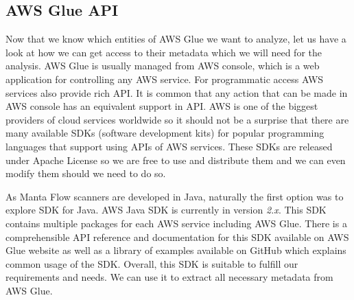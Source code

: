 \subsection{AWS Glue API}
Now that we know which entities of AWS Glue we want to analyze, let us have a look at how we can get access to their metadata which we will need for the analysis. AWS Glue is usually managed from AWS console, which is a web application for controlling any AWS service. For programmatic access AWS services also provide rich API. It is common that any action that can be made in AWS console has an equivalent support in API. AWS is one of the biggest providers of cloud services worldwide so it should not be a surprise that there are many available SDKs (software development kits) for popular programming languages that support using APIs of AWS services. These SDKs are released under Apache License so we are free to use and distribute them and we can even modify them should we need to do so.
\par
As Manta Flow scanners are developed in Java, naturally the first option was to explore SDK for Java. AWS Java SDK is currently in version \textit{2.x}. This SDK contains multiple packages for each AWS service including AWS Glue. There is a comprehensible API reference and documentation for this SDK available on AWS Glue website as well as a library of examples available on GitHub which explains common usage of the SDK. Overall, this SDK is suitable to fulfill our requirements and needs. We can use it to extract all necessary metadata from AWS Glue.

